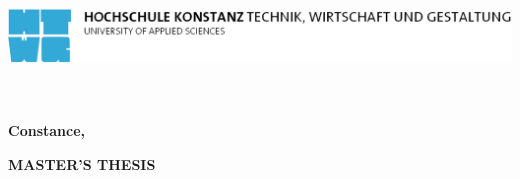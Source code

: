 
\begin{titlepage}

\vspace*{-3.5cm}

\begin{flushleft}
\hspace*{-1cm} \includegraphics[width=15.7cm]{htwg/htwg-logo}
\end{flushleft}

\vspace{2.5cm}

\begin{center}
	\huge{
		\textbf{\thema} \\[5cm]
	}
	\Large{
		\textbf{\autor}} \\[6.5cm]
	\large{
		\textbf{Constance, \abgabedatum} \\[2.3cm]
	}
	
	\Huge{
		\textbf{{\sf MASTER'S THESIS}}
	}
\end{center}

\end{titlepage}
